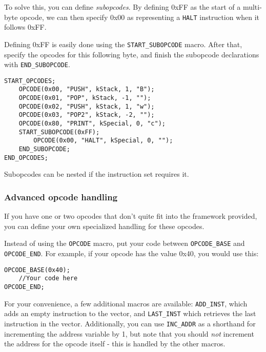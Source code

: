 To solve this, you can define \emph{subopcodes}. By defining 0xFF as the start of a multi-byte opcode, we can then specify 0x00 as representing a \verb+HALT+ instruction when it follows 0xFF.

Defining 0xFF is easily done using the \verb+START_SUBOPCODE+ macro. After that, specify the opcodes for this following byte, and finish the subopcode declarations with \verb+END_SUBOPCODE+.

\begin{C++}
\begin{lstlisting}
START_OPCODES;
	OPCODE(0x00, "PUSH", kStack, 1, "B");
	OPCODE(0x01, "POP", kStack, -1, "");
	OPCODE(0x02, "PUSH", kStack, 1, "w");
	OPCODE(0x03, "POP2", kStack, -2, "");
	OPCODE(0x80, "PRINT", kSpecial, 0, "c");
	START_SUBOPCODE(0xFF);
		OPCODE(0x00, "HALT", kSpecial, 0, "");
	END_SUBOPCODE;
END_OPCODES;
\end{lstlisting}
\end{C++}

Subopcodes can be nested if the instruction set requires it.

\subsubsection{Advanced opcode handling}
If you have one or two opcodes that don't quite fit into the framework provided, you can define your own specialized handling for these opcodes.

Instead of using the \verb+OPCODE+ macro, put your code between \verb+OPCODE_BASE+ and \verb+OPCODE_END+. For example, if your opcode has the value 0x40, you would use this:

\begin{C++}
\begin{lstlisting}
OPCODE_BASE(0x40);
	//Your code here
OPCODE_END;
\end{lstlisting}
\end{C++}

For your convenience, a few additional macros are available: \verb+ADD_INST+, which adds an empty instruction to the vector, and \verb+LAST_INST+ which retrieves the last instruction in the vector. Additionally, you can use \verb+INC_ADDR+ as a shorthand for incrementing the address variable by 1, but note that you should \emph{not} increment the address for the opcode itself - this is handled by the other macros.
